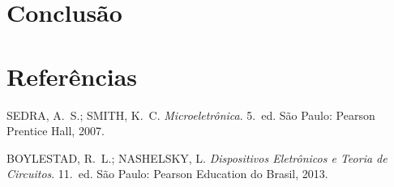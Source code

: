 \documentclass[11pt,a4paper]{article}
\begin{document}



\section{Conclusão}


\section{Referências}

\begin{referencias}
\item SEDRA, A.~S.; SMITH, K.~C. \emph{Microeletrônica}. 5.~ed. São Paulo: Pearson
      Prentice Hall, 2007.
\item BOYLESTAD, R.~L.; NASHELSKY, L. \emph{Dispositivos Eletrônicos e Teoria de
      Circuitos}. 11.~ed. São Paulo: Pearson Education do Brasil, 2013.
\end{referencias}
\end{document}

